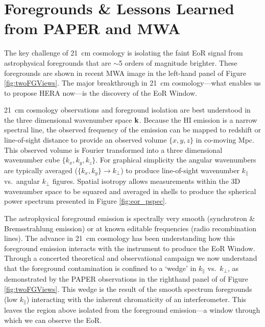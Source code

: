 \documentclass[preprint]{aastex}
\def\kperp{k_{\bot}}
\def\kpar{k_{\|}}
\def\k{{\bf k}}
\def\HI{{H{\small I }}}
\begin{document}
\vspace{-0.25in}
\section{Foregrounds \& Lessons Learned from PAPER and MWA}
\label{LessonsSec}

The key challenge of 21~cm cosmology is isolating the faint EoR signal from
astrophysical foregrounds that are $\sim$5 orders of magnitude brighter. These foregrounds
are shown in recent MWA image 
in the left-hand panel of Figure \ref{fig:twoFGViews}. The major breakthrough in
21~cm cosmology---what enables us to propose HERA now---is the discovery of the
EoR Window.

21~cm cosmology observations and foreground isolation are best understood in
the three dimensional wavenumber space $\k$.  Because the \HI emission is a
narrow spectral line, the observed frequency of the emission can be mapped to
redshift or line-of-sight distance to provide an observed volume $\{x,y,z\}$ in
co-moving Mpc. This observed volume is Fourier transformed into a three dimensional
wavenumber cube $\{k_{x}, k_{y}, k_{z}\}$. For graphical simplicity the angular
wavenumbers are typically averaged ($\{k_{x},k_{y}\}\rightarrow\kperp$) to
produce line-of-sight wavenumber $\kpar$ vs.\ angular $\kperp$ figures. 
Spatial isotropy allows measurements within the 3D wavenumber space to be
squared and averaged in shells to produce the spherical power spectrum
presented in Figure \ref{fig:eor_pspec}.

The astrophysical foreground emission is spectrally very smooth (synchrotron \&
Bremsstrahlung emission) or at known editable frequencies (radio recombination 
lines). The advance in 21~cm cosmology has been understanding how this
foreground emission interacts with the instrument to produce the EoR Window.
Through a concerted theoretical and observational campaign
\citep{morales_et_al2012,parsons_et_al2012b,vedantham_2012,Datta_2010,hazelton_et_al2013,pober_et_al2013,parsons_et_al2013,dillon_et_al2013b_trunc}
we now understand that the foreground contamination is confined to a `wedge' in
$\kpar$ vs.\ $\kperp$, as demonstrated by the PAPER observations in the
righthand panel of of Figure \ref{fig:twoFGViews}. This wedge is the result of
the smooth spectrum foregrounds (low $\kpar$) interacting with the inherent
chromaticity of an interferometer. This leaves the region above isolated from
the foreground emission---a window through which we can observe the EoR.
\end{document}
